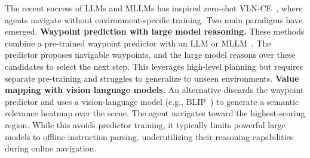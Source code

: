 \documentclass[letterpaper, 10 pt, conference]{ieeeconf}
\begin{document}

The recent success of LLMs and MLLMs has inspired zero-shot VLN-CE~\cite{qiao2024opennav, shi2025smartway, chen2025constraint, long2024instructnav}, where agents navigate without environment-specific training. Two main paradigms have emerged.
\textbf{Waypoint prediction with large model reasoning.} These methods combine a pre-trained waypoint predictor with an LLM or MLLM~\cite{qiao2024opennav, shi2025smartway}. The predictor proposes navigable waypoints, and the large model reasons over these candidates to select the next step. This leverages high-level planning but requires separate pre-training and struggles to generalize to unseen environments.
\textbf{Value mapping with vision language models.} An alternative discards the waypoint predictor and uses a vision-language model (e.g., BLIP~\cite{li2023blip2}) to generate a semantic relevance heatmap over the scene. The agent navigates toward the highest-scoring region. While this avoids predictor training, it typically limits powerful large models to offline instruction parsing, underutilizing their reasoning capabilities during online navigation.
\end{document}
